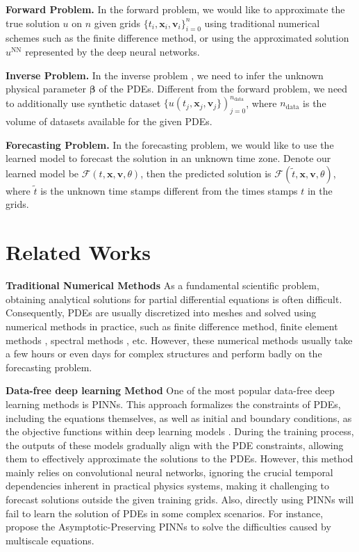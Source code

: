 \documentclass[preprint,11pt]{elsarticle}
\begin{document}
\textbf{Forward Problem.} In the forward problem, we would like to approximate the true solution $u$ on $n$ given grids $\{t_i,\boldsymbol{x}_i,\boldsymbol{v}_i\}_{i=0}^{n}$ using traditional numerical schemes such as the finite difference method,  or using the approximated solution $u^{\text{NN}}$ represented by the deep neural networks.

\textbf{Inverse Problem.} In the inverse problem \cite{aster2018parameter}, we need to infer the unknown physical parameter $\boldsymbol{\beta}$ of the PDEs. Different from the forward problem, we need to additionally use synthetic dataset $\{u(t_j,\boldsymbol{x}_j,\boldsymbol{v}_j\})_{j=0}^{n_{\text{data}}}$, where $n_{\text{data}}$ is the volume of datasets available for the given PDEs.

\textbf{Forecasting Problem.} In the forecasting problem, we would like to use the learned model to forecast the solution in an unknown time zone. Denote our learned model be $\mathcal{F}(t,\boldsymbol{x},\boldsymbol{v},\theta)$, then the predicted solution is $\mathcal{F} (\tilde{t},\boldsymbol{x},\boldsymbol{v},\theta)$, where $\tilde{t}$ is the unknown time stamps different from the times stamps $t$ in the grids. 

\section{Related Works}
\label{sec: related_works}
\textbf{Traditional Numerical Methods} As a fundamental scientific problem, obtaining analytical solutions for partial differential equations is often difficult. Consequently, PDEs are usually discretized into meshes and solved using numerical methods in practice, such as finite difference method\cite{sod1978survey}, finite element methods \cite{huebner2001finite}, spectral methods \cite{shen2011spectral}, etc. However, these numerical methods usually take a few hours or even days for complex structures \cite{umetani2018learning} and perform badly on the forecasting problem.

\textbf{Data-free deep learning Method} One of the most popular data-free deep learning methods is PINNs. This approach formalizes the constraints of PDEs, including the equations themselves, as well as initial and boundary conditions, as the objective functions within deep learning models \cite{raissi2019physics,yu2018deep}. During the training process, the outputs of these models gradually align with the PDE constraints, allowing them to effectively approximate the solutions to the PDEs. However, this method mainly relies
on convolutional neural networks, ignoring the crucial temporal dependencies inherent in practical physics systems, making it challenging to forecast solutions outside the given training grids. Also, directly using PINNs will fail to learn the solution of PDEs in some complex scenarios. For instance, \cite{jin2023asymptotic,liu2024asymptotic} propose the Asymptotic-Preserving PINNs to solve the difficulties caused by multiscale equations.
\end{document}
